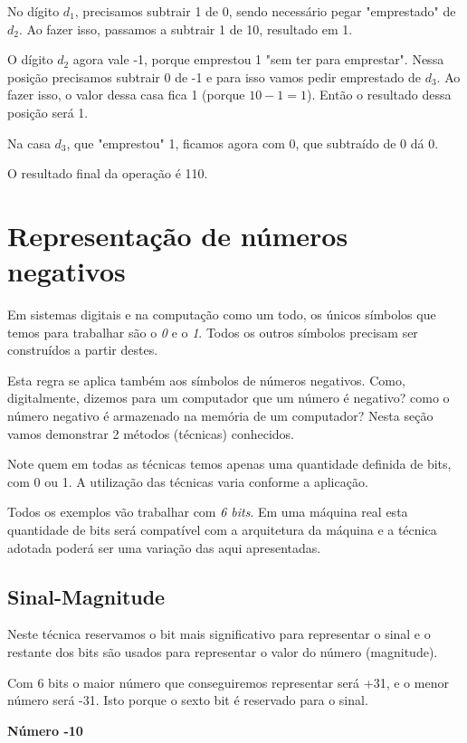 No dígito $d_1$, precisamos subtrair 1 de 0, sendo necessário pegar "emprestado" de $d_2$. Ao fazer isso, passamos a subtrair 1 de 10, resultado em 1.

O dígito $d_2$ agora vale -1, porque emprestou 1 "sem ter para emprestar". Nessa posição precisamos subtrair 0 de -1 e para isso vamos pedir emprestado de $d_3$. Ao fazer isso, o valor dessa casa fica 1 (porque $10 - 1 = 1 $). Então o resultado dessa posição será 1.

Na casa $d_3$, que "emprestou" 1, ficamos agora com 0, que subtraído de 0 dá 0.

O resultado final da operação é 110.


\section{Representação de números negativos}
\label{numerosNegativos}

Em sistemas digitais e na computação como um todo, os únicos símbolos que temos para trabalhar são o \emph{0} e o \emph{1}. Todos os outros símbolos precisam ser construídos a partir destes. 

Esta regra se aplica também aos símbolos de números negativos. Como, digitalmente, dizemos para um computador que um número é negativo? como o número negativo é armazenado na memória de um computador? Nesta seção vamos demonstrar 2 métodos (técnicas) conhecidos.

Note quem em todas as técnicas temos apenas uma quantidade definida de bits, com 0 ou 1. A utilização das técnicas varia conforme a aplicação.

Todos os exemplos vão trabalhar com \emph{6 bits}. Em uma máquina real esta quantidade de bits será compatível com a arquitetura da máquina e a técnica adotada poderá ser uma variação das aqui apresentadas.

\subsection{Sinal-Magnitude}
\label{sinalMagnitude}
Neste técnica reservamos o bit mais significativo para representar o sinal e o restante dos bits são usados para representar o valor do número (magnitude).

Com 6 bits o maior número que conseguiremos representar será +31, e o menor número será -31. Isto porque o sexto bit é reservado para o sinal.

\noindent\textbf{Número  -10}

